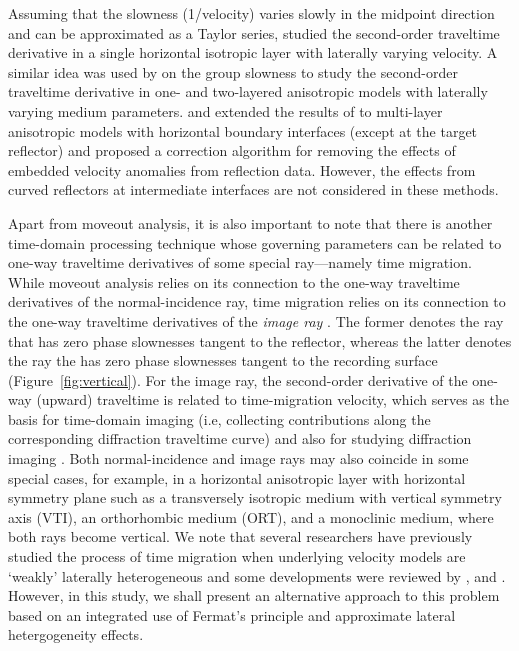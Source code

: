 Assuming that the slowness (1/velocity) varies slowly in the midpoint direction and can be approximated as a Taylor series, \cite{lynnclaerbout} studied the second-order traveltime derivative in a single horizontal isotropic layer with laterally varying velocity. A similar idea was used by \cite{grechkatsvankinlatvar} on the group slowness to study the second-order traveltime derivative in one- and two-layered anisotropic models with laterally varying medium parameters. \cite{takanashitsvankin11} and \cite{takanashitsvankin12} extended the results of \cite{grechkatsvankinlatvar} to multi-layer anisotropic models with horizontal boundary interfaces (except at the target reflector) and proposed a correction algorithm for removing the effects of embedded velocity anomalies from reflection data. However, the effects from curved reflectors at intermediate interfaces are not considered in these methods.


Apart from moveout analysis, it is also important to note that there is another time-domain processing technique whose governing parameters can be related to one-way traveltime derivatives of some special ray---namely time migration. While moveout analysis relies on its connection to the one-way traveltime derivatives of the normal-incidence ray, time migration relies on its connection to the one-way traveltime derivatives of the \textit{image ray} \cite[]{hubralimageray}. The former denotes the ray that has zero phase slownesses tangent to the reflector, whereas the latter denotes the ray the has zero phase slownesses tangent to the recording surface (Figure~\ref{fig:vertical}). For the image ray, the second-order derivative of the one-way (upward) traveltime is related to time-migration velocity, which serves as the basis for time-domain imaging (i.e, collecting contributions along the corresponding diffraction traveltime curve) and also for studying diffraction imaging \cite[]{fomeldiffrac,resheflanda}. Both normal-incidence and image rays may also coincide in some special cases, for example, in a horizontal anisotropic layer with horizontal symmetry plane such as a transversely isotropic medium with vertical symmetry axis (VTI), an orthorhombic medium (ORT), and a monoclinic medium, where both rays become vertical. We note that several researchers have previously studied the process of time migration when underlying velocity models are ‘weakly’ laterally heterogeneous and some developments were reviewed by \cite{cam}, \cite{schleicher} and \cite{iversen}. However, in this study, we shall present an alternative approach to this problem based on an integrated use of Fermat’s principle and approximate lateral hetergogeneity effects.


